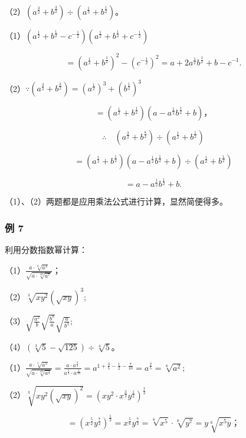 （2）\((a^{\frac{3}{2}} + b^{\frac{3}{2}}) \div (a^{\frac{1}{3}} + b^{\frac{1}{2}})\)。


（1）\((a^{\frac{1}{2}} + b^{\frac{1}{2}} - c^{-\frac{1}{2}})(a^{\frac{1}{2}} + b^{\frac{1}{2}} + c^{-\frac{1}{2}})\)

\[
= (a ^ {\frac{1}{2}} + b ^ {\frac{1}{2}}) ^ {2} - (c ^ {- \frac{1}{2}}) ^ {2} = a + 2 a ^ {\frac{1}{2}} b ^ {\frac{1}{2}} + b - c ^ {- 1}.
\]

（2）\(\because (a^{\frac{3}{2}} + b^{\frac{3}{2}}) = (a^{\frac{1}{2}})^{3} + (b^{\frac{1}{2}})^{3}\)

\[
= \left(a ^ {\frac{1}{2}} + b ^ {\frac{1}{2}}\right) \left(a - a ^ {\frac{1}{2}} b ^ {\frac{1}{2}} + b\right)\text{，}
\]

\[
\therefore \quad (a ^ {\frac{3}{2}} + b ^ {\frac{8}{2}}) \div (a ^ {\frac{1}{2}} + b ^ {\frac{1}{2}})
\]

\[
= \left(a ^ {\frac{1}{2}} + b ^ {\frac{1}{2}}\right) \left(a - a ^ {\frac{1}{2}} b ^ {\frac{1}{2}} + b\right) \div \left(a ^ {\frac{1}{2}} + b ^ {\frac{1}{2}}\right)
\]

\[
= a - a ^ {\frac{1}{2}} b ^ {\frac{1}{2}} + b.
\]

（1）、（2）两题都是应用乘法公式进行计算，显然简便得多。

\subsubsection{例 7}

利用分数指数幂计算：

（1）\(\frac{a \cdot \sqrt[6]{a^3}}{\sqrt{a \cdot \sqrt[10]{a^7}}}\)；

（2）\(\sqrt[3]{xy^2} (\sqrt{xy})^3;\)

（3）\(\sqrt{\frac{a^2}{b}}\sqrt{\frac{b^8}{a}}\sqrt{\frac{a}{b^3}};\)

（4）\((\sqrt[3]{5} - \sqrt{125}) \div \sqrt[4]{5}\)。

（1）\(\frac{a \cdot \sqrt[5]{a^5}}{\sqrt{a \cdot \sqrt[10]{a^4}}} = \frac{a \cdot a^{\frac{3}{2}}}{a^{\frac{1}{2}} \cdot a^{\frac{1}{10}}} = a^{1 + \frac{3}{5} - \frac{1}{2} - \frac{7}{10}} = a^{\frac{2}{5}} = \sqrt[6]{a^2};\)


（2）\(\sqrt[3]{xy^2(\sqrt{xy})^2} = (xy^2 \cdot x^{\frac{3}{2}}y^{\frac{1}{2}})^{\frac{1}{3}}\)

\[
= \left(x ^ {\frac{5}{2}} y ^ {\frac{7}{2}}\right) ^ {\frac{1}{3}} = x ^ {\frac{5}{6}} y ^ {\frac{7}{3}} = \sqrt[6]{x ^ {5}} \cdot \sqrt[6]{y ^ {7}} = y \sqrt[6]{x ^ {5} y}\text{；}
\]

